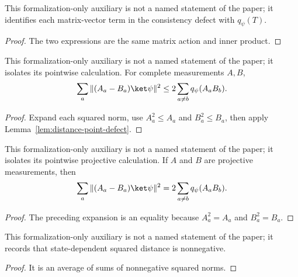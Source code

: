 \begin{lemma}
	\label{lem:distance-consistency-term}
	\leanok
	This formalization-only auxiliary is not a named statement of the paper; it
	identifies each matrix-vector term in the consistency defect with
	$q_\psi(T)$.
\end{lemma}
\begin{proof}
	\leanok
	The two expressions are the same matrix action and inner product.
\end{proof}

\begin{lemma}
	\label{lem:distance-point-distance-le-defect}
	\leanok
	This formalization-only auxiliary is not a named statement of the paper; it
	isolates its pointwise calculation. For complete measurements $A,B$,
	\[
		\sum_a\|(A_a-B_a)\ket\psi\|^2
		\leq 2\sum_{a\ne b}q_\psi(A_aB_b).
	\]
\end{lemma}
\begin{proof}
	\leanok
	Expand each squared norm, use $A_a^2\leq A_a$ and $B_a^2\leq B_a$,
	then apply Lemma~\ref{lem:distance-point-defect}.
\end{proof}

\begin{lemma}
	\label{lem:distance-projective-point-distance}
	\leanok
	This formalization-only auxiliary is not a named statement of the paper; it
	isolates its pointwise projective calculation. If $A$ and $B$ are
	projective measurements, then
	\[
		\sum_a\|(A_a-B_a)\ket\psi\|^2
		=2\sum_{a\ne b}q_\psi(A_aB_b).
	\]
\end{lemma}
\begin{proof}
	\leanok
	The preceding expansion is an equality because $A_a^2=A_a$ and
	$B_a^2=B_a$.
\end{proof}

\begin{lemma}
	\label{lem:distance-nonnegative}
	\leanok
	This formalization-only auxiliary is not a named statement of the paper; it
	records that state-dependent squared distance is nonnegative.
\end{lemma}
\begin{proof}
	\leanok
	It is an average of sums of nonnegative squared norms.
\end{proof}

